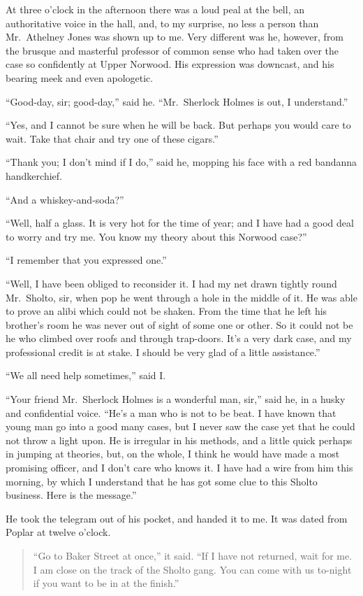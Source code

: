 \documentclass[12pt,english,oneside]{book}
\begin{document}
At three o'clock in the afternoon there was a loud peal at the bell,
an authoritative voice in the hall, and, to my surprise, no less a
person than Mr.\ Athelney Jones was shown up to me. Very different
was he, however, from the brusque and masterful professor of common
sense who had taken over the case so confidently at Upper Norwood.
His expression was downcast, and his bearing meek and even apologetic.

{}``Good-day, sir; good-day,'' said he. {}``Mr.\ Sherlock Holmes
is out, I understand.''

{}``Yes, and I cannot be sure when he will be back. But perhaps you
would care to wait. Take that chair and try one of these cigars.''

{}``Thank you; I don't mind if I do,'' said he, mopping his face
with a red bandanna handkerchief.

{}``And a whiskey-and-soda?''

{}``Well, half a glass. It is very hot for the time of year; and
I have had a good deal to worry and try me. You know my theory about
this Norwood case?''

{}``I remember that you expressed one.''

{}``Well, I have been obliged to reconsider it. I had my net drawn
tightly round Mr.\ Sholto, sir, when pop he went through a hole in
the middle of it. He was able to prove an alibi which could not be
shaken. From the time that he left his brother's room he was never
out of sight of some one or other. So it could not be he who climbed
over roofs and through trap-doors. It's a very dark case, and my professional
credit is at stake. I should be very glad of a little assistance.''

{}``We all need help sometimes,'' said I.

{}``Your friend Mr.\ Sherlock Holmes is a wonderful man, sir,''
said he, in a husky and confidential voice. {}``He's a man who is
not to be beat. I have known that young man go into a good many cases,
but I never saw the case yet that he could not throw a light upon.
He is irregular in his methods, and a little quick perhaps in jumping
at theories, but, on the whole, I think he would have made a most
promising officer, and I don't care who knows it. I have had a wire
from him this morning, by which I understand that he has got some
clue to this Sholto business. Here is the message.''

He took the telegram out of his pocket, and handed it to me. It was
dated from Poplar at twelve o'clock. \begin{quote} {}``Go to Baker
Street at once,'' it said. {}``If I have not returned, wait for
me. I am close on the track of the Sholto gang. You can come with
us to-night if you want to be in at the finish.''\end{quote}
\end{document}
